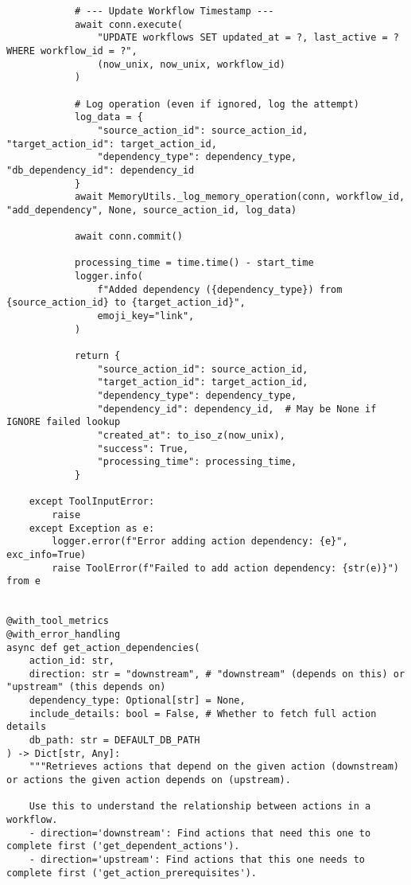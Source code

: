 \documentclass[12pt,a4paper]{article}
\begin{document}
\begin{pageablecode}
\begin{verbatim}
            # --- Update Workflow Timestamp ---
            await conn.execute(
                "UPDATE workflows SET updated_at = ?, last_active = ? WHERE workflow_id = ?",
                (now_unix, now_unix, workflow_id)
            )

            # Log operation (even if ignored, log the attempt)
            log_data = {
                "source_action_id": source_action_id, "target_action_id": target_action_id,
                "dependency_type": dependency_type, "db_dependency_id": dependency_id
            }
            await MemoryUtils._log_memory_operation(conn, workflow_id, "add_dependency", None, source_action_id, log_data)

            await conn.commit()

            processing_time = time.time() - start_time
            logger.info(
                f"Added dependency ({dependency_type}) from {source_action_id} to {target_action_id}",
                emoji_key="link",
            )

            return {
                "source_action_id": source_action_id,
                "target_action_id": target_action_id,
                "dependency_type": dependency_type,
                "dependency_id": dependency_id,  # May be None if IGNORE failed lookup
                "created_at": to_iso_z(now_unix),     
                "success": True,
                "processing_time": processing_time,
            }

    except ToolInputError:
        raise
    except Exception as e:
        logger.error(f"Error adding action dependency: {e}", exc_info=True)
        raise ToolError(f"Failed to add action dependency: {str(e)}") from e


@with_tool_metrics
@with_error_handling
async def get_action_dependencies(
    action_id: str,
    direction: str = "downstream", # "downstream" (depends on this) or "upstream" (this depends on)
    dependency_type: Optional[str] = None,
    include_details: bool = False, # Whether to fetch full action details
    db_path: str = DEFAULT_DB_PATH
) -> Dict[str, Any]:
    """Retrieves actions that depend on the given action (downstream) or actions the given action depends on (upstream).

    Use this to understand the relationship between actions in a workflow.
    - direction='downstream': Find actions that need this one to complete first ('get_dependent_actions').
    - direction='upstream': Find actions that this one needs to complete first ('get_action_prerequisites').


\end{verbatim}
\end{pageablecode}
\end{document}
